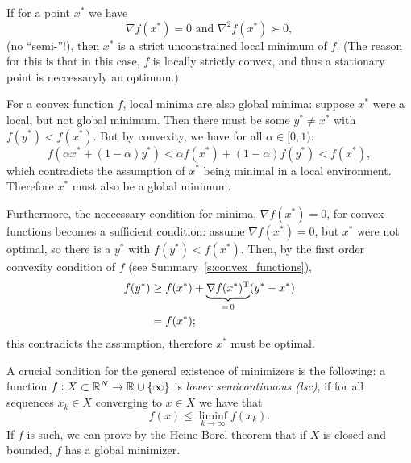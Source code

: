 \documentclass{article}
\begin{document}
\label{s:sufficient-optimality}

If for a point \(x^*\) we have
\begin{equation*}
  \nabla f(x^*) = 0 \text{ and } \nabla^2 f(x^*) \succ 0,
\end{equation*}
(no ``semi-''!), then \(x^*\) is a strict unconstrained local minimum of \(f\).  (The reason for
this is that in this case, \(f\) is locally strictly convex, and thus a stationary point is
neccessaryly an optimum.)


\label{s:convex-minima}

For a convex function \(f\), local minima are also global minima: suppose \(x^*\) were a local, but
not global minimum.  Then there must be some \(y^* \neq x^*\) with \(f(y^*) < f(x^*)\).  But by
convexity, we have for all \(\alpha \in [0, 1)\):
\begin{equation*}
  f(\alpha x^* + (1 - \alpha) y^*) < \alpha f(x^*) + (1 - \alpha) f(y^*) < f(x^*),
\end{equation*}
which contradicts the assumption of \(x^*\) being minimal in a local environment. Therefore \(x^*\)
must also be a global minimum.

Furthermore, the neccessary condition for minima, \(\nabla f(x^*) = 0\), for convex functions
becomes a sufficient condition: assume \(\nabla f(x^*) = 0\), but \(x^*\) were not optimal, so there
is a \(y^*\) with \(f(y^*) < f(x^*)\).  Then, by the first order convexity condition of \(f\) (see
Summary~\ref{s:convex_functions}),
\begin{align*}
  f(y^*) &\geq f(x^*) + \underbrace{\nabla f(x^*)^{\mathrm{T}}}_{=\, 0}(y^* - x^*) \\
         &= f(x^*);
\end{align*}
this contradicts the assumption, therefore \(x^*\) must be optimal.

\label{s:minimizers-existence}

A crucial condition for the general existence of minimizers is the following: a function
\(f: X \subset \mathbb{R}^N \to \mathbb{R} \cup \{\infty\}\) is \emph{lower semicontinuous (lsc)}, if for all
sequences \({x_k} \in X\) converging to \(x \in X\) we have that
\begin{equation*}
  f(x) \leq \liminf_{k \to \infty} f(x_k).
\end{equation*}
If \(f\) is such, we can prove by the Heine-Borel theorem that if \(X\) is closed and bounded, \(f\)
has a global minimizer.
\end{document}
